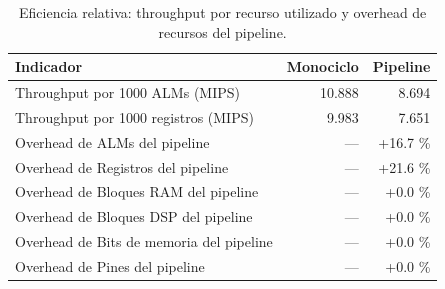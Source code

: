 \begin{table}[htbp]
\centering
\caption{Eficiencia relativa: throughput por recurso utilizado y overhead de recursos del pipeline.}
\label{tab:efficiency}
\begin{tabular}{lrr}
\toprule
Indicador & Monociclo & Pipeline \\
\midrule
Throughput por 1000 ALMs (MIPS) & 10.888 & 8.694 \\
Throughput por 1000 registros (MIPS) & 9.983 & 7.651 \\
Overhead de ALMs del pipeline & --- & +16.7 \% \\
Overhead de Registros del pipeline & --- & +21.6 \% \\
Overhead de Bloques RAM del pipeline & --- & +0.0 \% \\
Overhead de Bloques DSP del pipeline & --- & +0.0 \% \\
Overhead de Bits de memoria del pipeline & --- & +0.0 \% \\
Overhead de Pines del pipeline & --- & +0.0 \% \\
\bottomrule
\end{tabular}
\end{table}
